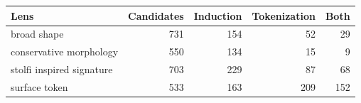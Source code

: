 \begin{tabular}{lrrrr}
\toprule
Lens & Candidates & Induction & Tokenization & Both \\
\midrule
broad shape & 731 & 154 & 52 & 29 \\
conservative morphology & 550 & 134 & 15 & 9 \\
stolfi inspired signature & 703 & 229 & 87 & 68 \\
surface token & 533 & 163 & 209 & 152 \\
\bottomrule
\end{tabular}